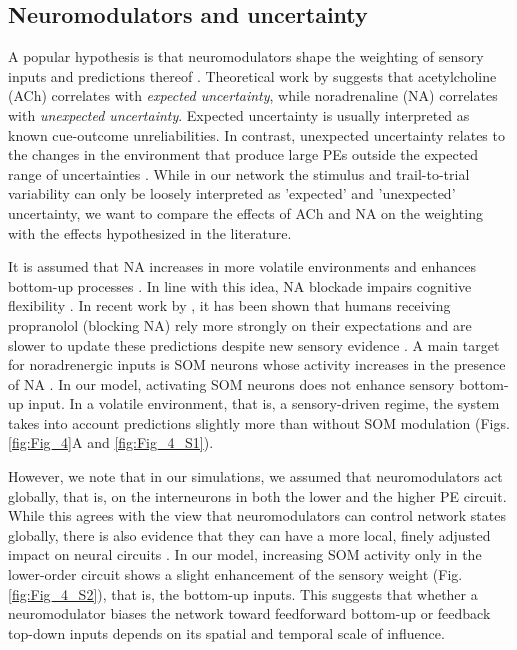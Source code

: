 \documentclass[10pt,a4paper]{article}
\begin{document}
\subsection*{Neuromodulators and uncertainty}
%
A popular hypothesis is that neuromodulators shape the weighting of sensory inputs and predictions thereof \citep{yon2021precision}. Theoretical work by \cite{yu2005uncertainty} suggests that acetylcholine (ACh) correlates with \textit{expected uncertainty}, while noradrenaline (NA) correlates with \textit{unexpected uncertainty}. Expected uncertainty is usually interpreted as known cue-outcome unreliabilities. In contrast, unexpected uncertainty relates to the changes in the environment that produce large PEs outside the expected range of uncertainties \citep{yu2005uncertainty}. While in our network the stimulus and trail-to-trial variability can only be loosely interpreted as 'expected' and 'unexpected' uncertainty, we want to compare the effects of ACh and NA on the weighting with the effects hypothesized in the literature.

It is assumed that NA increases in more volatile environments and enhances bottom-up processes \citep{hasselmo1997noradrenergic, yon2021precision}. In line with this idea, NA blockade impairs cognitive flexibility \citep{ridley1981new, janitzky2015optogenetic}. In recent work by \cite{lawson2021computational}, it has been shown that humans receiving propranolol (blocking NA) rely more strongly on their expectations and are slower to update these predictions despite new sensory evidence \citep{yon2021precision}. A main target for noradrenergic inputs is SOM neurons whose activity increases in the presence of NA \citep[reviewed in, e.g.,][]{urban2016somatostatin, hattori2017functions, swanson2019hiring}. In our model, activating SOM neurons does not enhance sensory bottom-up input. In a volatile environment, that is, a sensory-driven regime, the system takes into account predictions slightly more than without SOM modulation (Figs. \ref{fig:Fig_4}A and \ref{fig:Fig_4_S1}). 

However, we note that in our simulations, we assumed that neuromodulators act globally, that is, on the interneurons in both the lower and the higher PE circuit. While this agrees with the view that neuromodulators can control network states globally, there is also evidence that they can have a more local, finely adjusted impact on neural circuits \citep{nadim2014neuromodulation}. In our model, increasing SOM activity only in the lower-order circuit shows a slight enhancement of the sensory weight (Fig. \ref{fig:Fig_4_S2}), that is, the bottom-up inputs. This suggests that whether a neuromodulator biases the network toward feedforward bottom-up or feedback top-down inputs depends on its spatial and temporal scale of influence.
\end{document}

